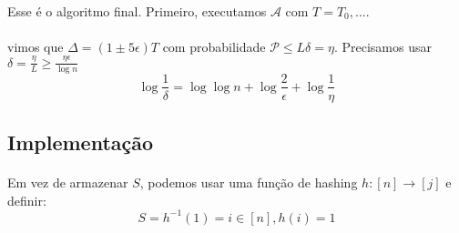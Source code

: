 \paragraph{} Esse é o algoritmo final. Primeiro, executamos $\mathcal{A}$ com $T=T_0,...$.
\paragraph{} vimos que $\Delta=(1 \pm 5\epsilon)T$ com probabilidade $\mathcal{P} \leq L\delta=\eta$. Precisamos usar $\delta=\frac{\eta}{L}\geq\frac{\eta \epsilon}{\log{n}}$
$$\log{\frac{1}{\delta}}=\log{\log{n}}+\log{\frac{2}{\epsilon}}+\log{\frac{1}{\eta}}$$

\subsection{Implementação}
\paragraph{}Em vez de armazenar $S$, podemos usar uma função de hashing $h:[n] \rightarrow [j]$ e definir:
$$S = h^{-1}(1) ={ i \in [n], h(i) = 1}$$

